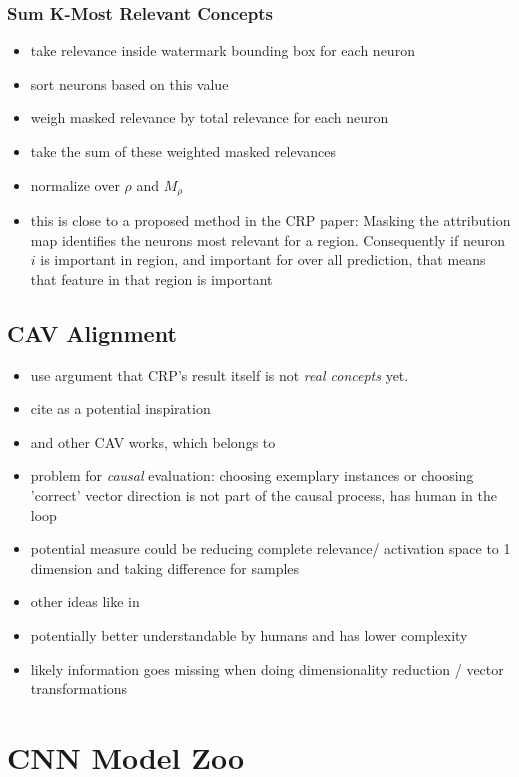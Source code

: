 \subsubsection{Sum K-Most Relevant Concepts}
\begin{itemize}
    \item take relevance inside watermark bounding box for each neuron
    \item sort neurons based on this value
    \item weigh masked relevance by total relevance for each neuron
    \item take the sum of these weighted masked relevances
    \item normalize over $\rho$ and $M_{\rho}$
    \item this is close to a proposed method in the CRP paper: Masking the attribution map identifies the neurons most relevant for a region. Consequently if neuron $i$ is important in region, and important for over all prediction, that means that feature in that region is important
\end{itemize}
\subsection{CAV Alignment}
\begin{itemize}
    \item use argument that CRP's result itself is not \textit{real concepts} yet. 
    \item cite \cite{Dreyer2023a} as a potential inspiration
    \item and other CAV works, which \cite{Kim2018} belongs to
    \item problem for \textit{causal} evaluation: choosing exemplary instances or choosing 'correct' vector direction is not part of the causal process, has human in the loop
    \item potential measure could be reducing complete relevance/ activation space to 1 dimension and taking difference for samples
    \item other ideas like in \cite{Chormai2022,Leemann2023,Ghorbani2019,Zhang2021}
    \item potentially better understandable by humans and has lower complexity
    \item likely information goes missing when doing dimensionality reduction / vector transformations
\end{itemize}

\section{CNN Model Zoo}\label{section:training}
